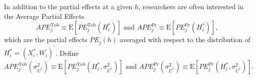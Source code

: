 \documentclass[12pt]{article}
\begin{document}
In addition to the partial effects at a given $h$, researchers are often
interested in the Average Partial Effects%
\begin{equation}
APE_{j}^{\text{Tob}}\equiv \mathrm{E}\left[ PE_{j}^{\text{Tob}}\left(
H_{i}^{\ast }\right) \right] \text{ and }APE_{j}^{\Pr }\equiv \mathrm{E}%
\left[ PE_{j}^{\Pr }\left( H_{i}^{\ast }\right) \right] ,
\label{eq:APEs def}
\end{equation}%
which are the partial effects $PE_{j}\left( h\right) $ averaged with respect
to the distribution of {}$H_{i}^{\ast }=\left(
X_{i}^{\ast },W_{i}^{\prime }\right) ^{\prime }$. Define%
\begin{equation*}
APE_{j}^{\text{Tob}}\left( \sigma _{U^{\ast }}^{2}\right) \equiv \mathrm{E}%
\left[ PE_{j}^{\text{Tob}}\left( H_{i}^{\ast },\sigma _{U^{\ast
}}^{2}\right) \right] \text{ and }APE_{j}^{\Pr }\left( \sigma _{U^{\ast
}}^{2}\right) \equiv \mathrm{E}\left[ PE_{j}^{\Pr }\left( H_{i}^{\ast
},\sigma _{U^{\ast }}^{2}\right) \right] .
\end{equation*}
\end{document}
